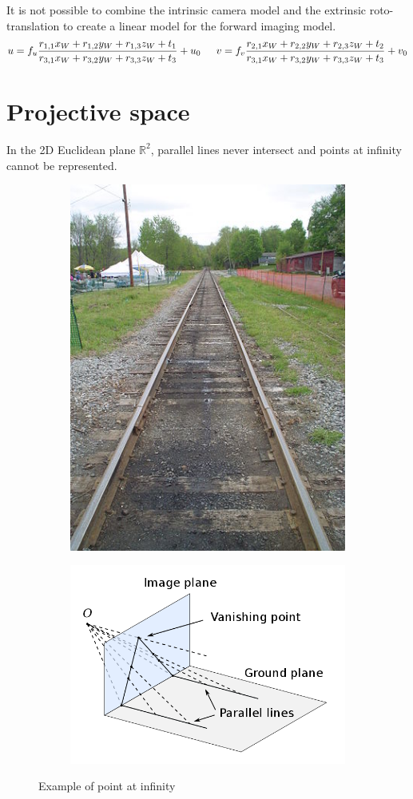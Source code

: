 \begin{remark}
    It is not possible to combine the intrinsic camera model and the extrinsic roto-translation to
    create a linear model for the forward imaging model.
    \[
        u = f_u \frac{r_{1,1}x_W + r_{1,2}y_W + r_{1,3}z_W + t_1}{r_{3,1}x_W + r_{3,2}y_W + r_{3,3}z_W + t_3} + u_0
        \hspace{1.5em}
        v = f_v \frac{r_{2,1}x_W + r_{2,2}y_W + r_{2,3}z_W + t_2}{r_{3,1}x_W + r_{3,2}y_W + r_{3,3}z_W + t_3} + v_0
    \]
\end{remark}



\section{Projective space}

\begin{remark}
    In the 2D Euclidean plane $\mathbb{R}^2$, parallel lines never intersect and points at infinity cannot be represented.
    \begin{figure}[H]
        \centering
        \begin{subfigure}{0.45\linewidth}
            \centering
            \includegraphics[width=0.45\linewidth]{./img/point_infinity_example1.png}
        \end{subfigure}
        \begin{subfigure}{0.45\linewidth}
            \centering
            \includegraphics[width=0.8\linewidth]{./img/point_infinity_example2.png}
        \end{subfigure}
        \caption{Example of point at infinity}
    \end{figure}
\end{remark}

